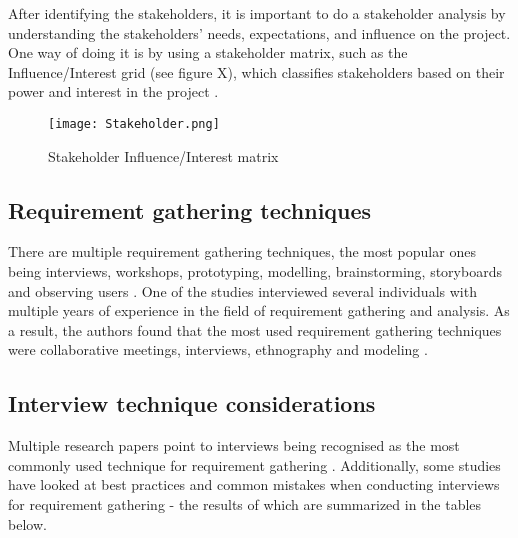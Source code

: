 After identifying the stakeholders, it is important to do a stakeholder analysis by understanding the stakeholders' needs, expectations, and influence on the project. One way of doing it is by using a stakeholder matrix, such as the Influence/Interest grid (see figure X), which classifies stakeholders based on their power and interest in the project \parencite{stakeholders}.

\begin{figure}[ht]
    \centering
    \texttt{[image: Stakeholder.png]}
    \caption{Stakeholder Influence/Interest matrix}
    \label{fig:stakeholder_matrix}
\end{figure}


\subsection{Requirement gathering techniques}

There are multiple requirement gathering techniques, the most popular ones being interviews, workshops, prototyping, modelling, brainstorming, storyboards and observing users \parencite{reqanalysis1,reqanalysis2, reqanalysis3, reqanalysis4}. One of the studies interviewed several individuals with multiple years of experience in the field of requirement gathering and analysis. As a result, the authors found that the most used requirement gathering techniques were collaborative meetings, interviews, ethnography and modeling \parencite{reqanalysis1}.

\subsection{Interview technique considerations}

Multiple research papers point to interviews being recognised as the most commonly used technique for requirement gathering \parencite{interviews5,interviews1,interviews2}. Additionally, some studies have looked at best practices and common mistakes when conducting interviews for requirement gathering - the results of which are summarized in the tables below.

